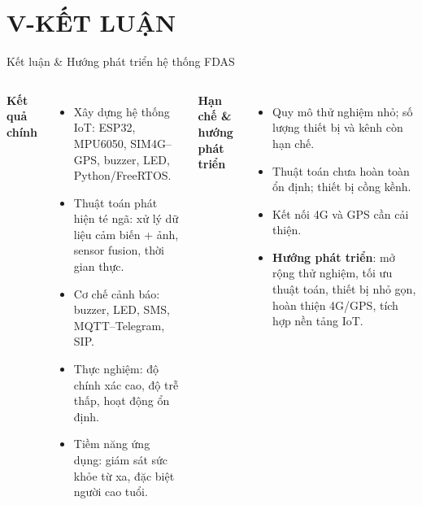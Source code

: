 \section{V-KẾT LUẬN}
\begin{frame}{Kết luận & Hướng phát triển hệ thống FDAS}
\begin{columns}[T]
    \textbf{Kết quả chính}
    \begin{itemize}
        \item Xây dựng hệ thống IoT: ESP32, MPU6050, SIM4G--GPS, buzzer, LED, Python/FreeRTOS.
        \item Thuật toán phát hiện té ngã: xử lý dữ liệu cảm biến + ảnh, sensor fusion, thời gian thực.
        \item Cơ chế cảnh báo: buzzer, LED, SMS, MQTT--Telegram, SIP.
        \item Thực nghiệm: độ chính xác cao, độ trễ thấp, hoạt động ổn định.
        \item Tiềm năng ứng dụng: giám sát sức khỏe từ xa, đặc biệt người cao tuổi.
    \end{itemize}

    \textbf{Hạn chế \& hướng phát triển}
    \begin{itemize}
        \item Quy mô thử nghiệm nhỏ; số lượng thiết bị và kênh còn hạn chế.
        \item Thuật toán chưa hoàn toàn ổn định; thiết bị cồng kềnh.
        \item Kết nối 4G và GPS cần cải thiện.
        \item \textbf{Hướng phát triển}: mở rộng thử nghiệm, tối ưu thuật toán, thiết bị nhỏ gọn, hoàn thiện 4G/GPS, tích hợp nền tảng IoT.
    \end{itemize}
\end{columns}
\end{frame}

